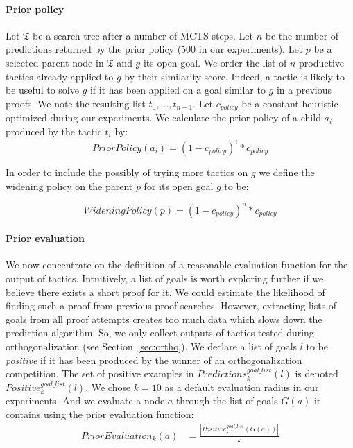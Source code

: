 \documentclass[runningheads,a4paper,draft]{svjour3}
\begin{document}
\paragraph{Prior policy}\label{sec:policy}
Let $\mathfrak{T}$ be a search tree after a number of MCTS steps.
Let $n$ be the number of predictions returned by the prior policy (500 in our 
experiments).
Let $p$ be a selected parent node in $\mathfrak{T}$ and $g$ its open goal. We 
order the list of $n$ productive tactics already
applied to $g$ by their similarity score. Indeed, a tactic is likely to 
be useful to solve $g$ if it has been applied on a goal similar to 
$g$ in a previous proofs. 
We note the resulting list
$t_0,\ldots,t_{n-1}$.
Let $c_{\mathit{policy}}$ be a constant heuristic optimized during our experiments.
We calculate the prior policy of a child $a_i$ produced by the tactic
$t_i$ by:
\[\mathit{PriorPolicy}(a_i) = (1 - c_{\mathit{policy}})^{i} * c_{\mathit{policy}}\]

In order to include the possibly of trying more tactics on $g$ we define the
widening policy on the parent $p$ for its open goal $g$ to be:

\[\mathit{WideningPolicy}(p) = (1 - c_{\mathit{policy}})^{n} * 
c_{\mathit{policy}}\]


\paragraph{Prior evaluation}\label{sec:evaluation}

We now concentrate on the definition of a reasonable evaluation function for the
output of tactics. Intuitively, a list of goals is worth exploring further if
we believe there exists a short proof for it. We could estimate the likelihood
of finding such a proof from
previous proof searches. However, extracting lists of goals from all proof
attempts creates too much data which slows down the prediction algorithm.
So, we only
collect outputs of tactics tested during orthogonalization (see
Section~\ref{sec:ortho}). We
declare a list of goals $l$ to be \textit{positive} if it has been produced
by the winner of an orthogonalization competition.
The set of positive examples in
$\mathit{Predictions}^{\mathit{goal\_list}}_k(l)$ is denoted
$\mathit{Positive}^{\mathit{goal\_list}}_k(l)$.
We chose $k=10$ as a default evaluation radius in our experiments.
And we evaluate a node $a$ through the list of goals $G(a)$ it
contains using the prior evaluation function:
\begin{align*}
\mathit{PriorEvaluation}_k (a) &=
  \frac{|\mathit{Positive}^{\mathit{goal\_list}}_k(G(a))|}{k}\\
\end{align*}
\end{document}
